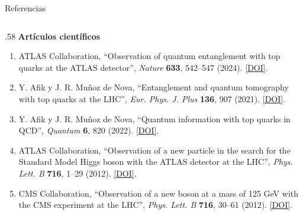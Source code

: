 \documentclass[aspectratio=169,11pt]{beamer}
\begin{document}
\begin{frame}{Referencias}
\vspace{-0.08cm}
\begin{columns}[T,totalwidth=.98\textwidth]
\begin{column}{.58\textwidth}
{\color{AtlasBlue}\bfseries\small Artículos científicos}\par
\vspace{0.06cm}
{\tiny
\begin{enumerate}
\setlength{\itemsep}{0.10cm}
\item ATLAS Collaboration, ``Observation of quantum entanglement with top quarks at the ATLAS detector'', \emph{Nature} \textbf{633}, 542--547 (2024). \href{https://doi.org/10.1038/s41586-024-07824-z}{\color{AtlasCyan}[DOI]}.
\item Y. Afik y J. R. Muñoz de Nova, ``Entanglement and quantum tomography with top quarks at the LHC'', \emph{Eur. Phys. J. Plus} \textbf{136}, 907 (2021). \href{https://doi.org/10.1140/epjp/s13360-021-01902-1}{\color{AtlasCyan}[DOI]}.
\item Y. Afik y J. R. Muñoz de Nova, ``Quantum information with top quarks in QCD'', \emph{Quantum} \textbf{6}, 820 (2022). \href{https://doi.org/10.22331/q-2022-09-29-820}{\color{AtlasCyan}[DOI]}.
\item ATLAS Collaboration, ``Observation of a new particle in the search for the Standard Model Higgs boson with the ATLAS detector at the LHC'', \emph{Phys. Lett. B} \textbf{716}, 1--29 (2012). \href{https://doi.org/10.1016/j.physletb.2012.08.020}{\color{AtlasCyan}[DOI]}.
\item CMS Collaboration, ``Observation of a new boson at a mass of 125 GeV with the CMS experiment at the LHC'', \emph{Phys. Lett. B} \textbf{716}, 30--61 (2012). \href{https://doi.org/10.1016/j.physletb.2012.08.021}{\color{AtlasCyan}[DOI]}.
\end{enumerate}}
\end{column}


\end{columns}
\end{frame}
\end{document}
